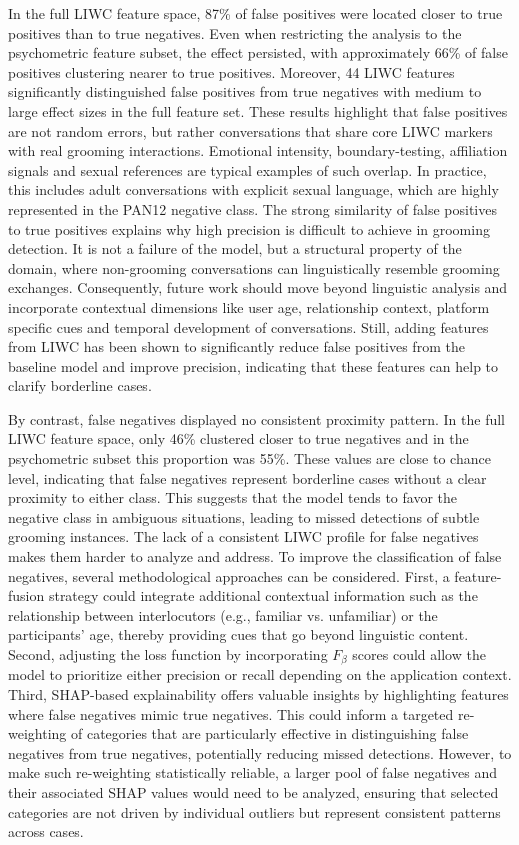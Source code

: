 In the full LIWC feature space, 87\% of false positives were located closer to true positives than to true negatives. Even when restricting the analysis to the psychometric feature subset, the effect persisted, with approximately 66\% of false positives clustering nearer to true positives. Moreover, 44 LIWC features significantly distinguished false positives from true negatives with medium to large effect sizes in the full feature set. These results highlight that false positives are not random errors, but rather conversations that share core LIWC markers with real grooming interactions. Emotional intensity, boundary-testing, affiliation signals and sexual references are typical examples of such overlap. In practice, this includes adult conversations with explicit sexual language, which are highly represented in the PAN12 negative class. The strong similarity of false positives to true positives explains why high precision is difficult to achieve in grooming detection. It is not a failure of the model, but a structural property of the domain, where non-grooming conversations can linguistically resemble grooming exchanges. Consequently, future work should move beyond linguistic analysis and incorporate contextual dimensions like user age, relationship context, platform specific cues and temporal development of conversations. Still, adding features from LIWC has been shown to significantly reduce false positives from the baseline model and improve precision, indicating that these features can help to clarify borderline cases.

By contrast, false negatives displayed no consistent proximity pattern. In the full LIWC feature space, only 46\% clustered closer to true negatives and in the psychometric subset this proportion was 55\%. These values are close to chance level, indicating that false negatives represent borderline cases without a clear proximity to either class. This suggests that the model tends to favor the negative class in ambiguous situations, leading to missed detections of subtle grooming instances. The lack of a consistent LIWC profile for false negatives makes them harder to analyze and address. To improve the classification of false negatives, several methodological approaches can be considered. First, a feature-fusion strategy could integrate additional contextual information such as the relationship between interlocutors (e.g., familiar vs. unfamiliar) or the participants’ age, thereby providing cues that go beyond linguistic content. Second, adjusting the loss function by incorporating $F_{\beta}$ scores could allow the model to prioritize either precision or recall depending on the application context. Third, SHAP-based explainability offers valuable insights by highlighting features where false negatives mimic true negatives. This could inform a targeted re-weighting of categories that are particularly effective in distinguishing false negatives from true negatives, potentially reducing missed detections.  However, to make such re-weighting statistically reliable, a larger pool of false negatives and their associated SHAP values would need to be analyzed, ensuring that selected categories are not driven by individual outliers but represent consistent patterns across cases.


